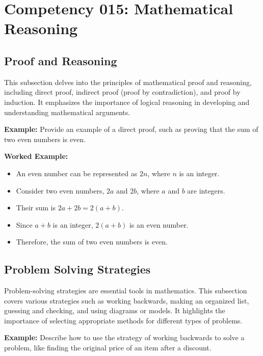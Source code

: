 \documentclass{book}
\begin{document}
\section{Competency 015: Mathematical Reasoning}


\subsection{Proof and Reasoning}
This subsection delves into the principles of mathematical proof and reasoning, including direct proof, indirect proof (proof by contradiction), and proof by induction. It emphasizes the importance of logical reasoning in developing and understanding mathematical arguments.


\textbf{Example:} Provide an example of a direct proof, such as proving that the sum of two even numbers is even.


\textbf{Worked Example:}
\begin{itemize}
        \item An even number can be represented as \(2n\), where \(n\) is an integer.
        \item Consider two even numbers, \(2a\) and \(2b\), where \(a\) and \(b\) are integers.
        \item Their sum is \(2a + 2b = 2(a + b)\).
        \item Since \(a + b\) is an integer, \(2(a + b)\) is an even number.
        \item Therefore, the sum of two even numbers is even.
\end{itemize}


\subsection{Problem Solving Strategies}
Problem-solving strategies are essential tools in mathematics. This subsection covers various strategies such as working backwards, making an organized list, guessing and checking, and using diagrams or models. It highlights the importance of selecting appropriate methods for different types of problems.


\textbf{Example:} Describe how to use the strategy of working backwards to solve a problem, like finding the original price of an item after a discount.
\end{document}

